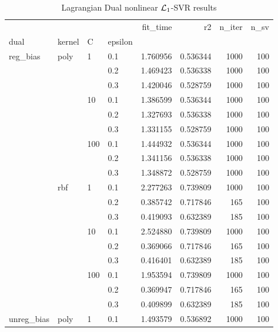 \begin{table}[H]
\centering
\caption{Lagrangian Dual nonlinear $\protect \mathcal{L}_1$-SVR results}
\label{nonlinear_lagrangian_dual_l1_svr_cv_results}
\begin{tabular}{llllrrrr}
\toprule
           &     &     &     &  fit\_time &        r2 &  n\_iter &  n\_sv \\
dual & kernel & C & epsilon &           &           &         &       \\
\midrule
reg\_bias & poly & 1   & 0.1 &  1.760956 &  0.536344 &    1000 &   100 \\
           &     &     & 0.2 &  1.469423 &  0.536338 &    1000 &   100 \\
           &     &     & 0.3 &  1.420046 &  0.528759 &    1000 &   100 \\
           &     & 10  & 0.1 &  1.386599 &  0.536344 &    1000 &   100 \\
           &     &     & 0.2 &  1.327693 &  0.536338 &    1000 &   100 \\
           &     &     & 0.3 &  1.331155 &  0.528759 &    1000 &   100 \\
           &     & 100 & 0.1 &  1.444932 &  0.536344 &    1000 &   100 \\
           &     &     & 0.2 &  1.341156 &  0.536338 &    1000 &   100 \\
           &     &     & 0.3 &  1.348872 &  0.528759 &    1000 &   100 \\
           & rbf & 1   & 0.1 &  2.277263 &  0.739809 &    1000 &   100 \\
           &     &     & 0.2 &  0.385742 &  0.717846 &     165 &   100 \\
           &     &     & 0.3 &  0.419093 &  0.632389 &     185 &   100 \\
           &     & 10  & 0.1 &  2.524880 &  0.739809 &    1000 &   100 \\
           &     &     & 0.2 &  0.369066 &  0.717846 &     165 &   100 \\
           &     &     & 0.3 &  0.416401 &  0.632389 &     185 &   100 \\
           &     & 100 & 0.1 &  1.953594 &  0.739809 &    1000 &   100 \\
           &     &     & 0.2 &  0.369947 &  0.717846 &     165 &   100 \\
           &     &     & 0.3 &  0.409899 &  0.632389 &     185 &   100 \\
unreg\_bias & poly & 1   & 0.1 &  1.493579 &  0.536892 &    1000 &   100 \\

\end{tabular}
\end{table}
